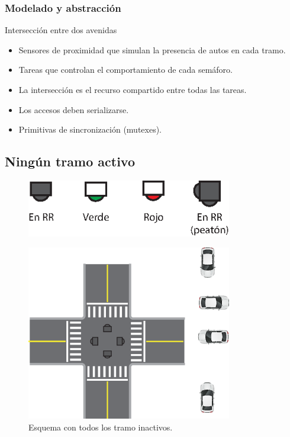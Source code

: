 \begin{frame}
\frametitle{Modelado y abstracción}
\begin{block}{Intersección entre dos avenidas}
	\begin{itemize}
		\item Sensores de proximidad que simulan la presencia de autos en cada tramo.
		\item Tareas que controlan el comportamiento de cada semáforo.
		\item La intersección es el recurso compartido entre todas las tareas.
		\item Los accesos deben serializarse.
		\item Primitivas de sincronización (mutexes).
	\end{itemize}
\end{block}
\end{frame}

\subsection{Ningún tramo activo}
\begin{figure}[htbp]
	\centering
	\includegraphics[width=0.8\textwidth]{diagramas/leyenda.eps}
\end{figure}
\begin{figure}[htbp]
	\centering
	\includegraphics[width=0.8\textwidth]{diagramas/ningun-activo.eps}
	\caption{Esquema con todos los tramo inactivos.}
\end{figure}

